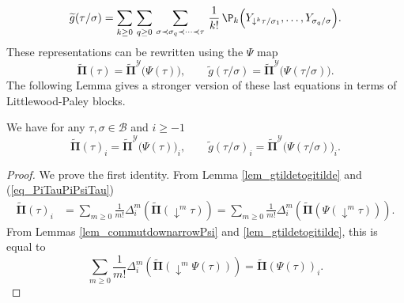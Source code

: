\documentclass[11pt]{preprint}
\newcommand{\mcB}{\mathcal{B}}
\newcommand{\mcY}{\mathcal{Y}}
\def\PPi{\boldsymbol{\Pi}}
\def\eqref#1{(\ref{#1})}
\begin{document}
	\begin{equation}\label{eq_ParacRepIterated2}
		\widetilde{ g}(\tau/\sigma) = \sum_{k\geq 0 } \, \sum_{q\geq 0} \, \sum_{\sigma\prec\sigma_q\prec\dots\prec \tau} \, \frac{1}{k!} \, \P_k\Big(Y_{\downarrow^k\hspace{0pt}\tau/\sigma_1},\dots, Y_{\sigma_q/\sigma} \Big).
	\end{equation}
	These representations can be rewritten using the $\Psi$ map
	\begin{equation} \label{eq_PiTauPiPsiTau}
		\widetilde{\PPi}(\tau) = 	\widetilde{\PPi}^\mcY\big(\Psi(\tau)\big)
		,\qquad
		\widetilde{ g}(\tau/\sigma) = \widetilde{\PPi}^\mcY\big(\Psi(\tau/\sigma)\big).
	\end{equation}
	The following Lemma gives a stronger version of these last equations in terms of Littlewood-Paley blocks. 
	\begin{lemma} \label{lem_PiiPiPsii_00}
		We have for any $\tau,\sigma\in\mcB$ and $i\geq-1$
		$$
			\widetilde{\PPi}(\tau)_i = 	\widetilde{\PPi}^\mcY\big(\Psi(\tau)\big)_i, 
			\qquad
			 \widetilde{g}(\tau/\sigma)_i = 	\widetilde{\PPi}^\mcY\big(\Psi(\tau/\sigma)\big)_i.
		$$
	\end{lemma}
	\begin{proof}
	We prove the first identity. From Lemma \ref{lem_gtildetogitilde} and \eqref{eq_PiTauPiPsiTau}
	\begin{align*}
		\widetilde{\PPi}(\tau)_i &= \sum_{m\geq 0}\frac{1}{m!}\Delta_i^m\left(\widetilde{\PPi}(\downarrow^m\tau)\right) 
		= \sum_{m\geq 0}\frac{1}{m!}\Delta_i^m\left(\widetilde{\PPi}(\Psi(\downarrow^m\tau))\right). \end{align*}
	From Lemmas \ref{lem_commutdownarrowPsi} and \ref{lem_gtildetogitilde}, this is equal to
	$$
	\sum_{m\geq 0}\frac{1}{m!}\Delta_i^m\left(\widetilde{\PPi}(\downarrow^m\Psi(\tau))\right)  = 	\widetilde{\PPi}\left(\Psi(\tau)\right)_i.
	$$
	\end{proof}
	
\end{document}
